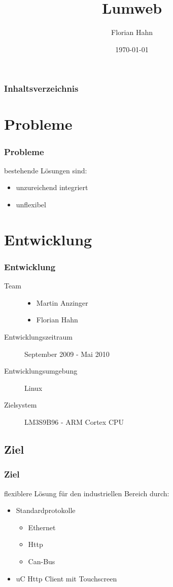 \documentclass{beamer}
\begin{document}
\title{Lumweb}  
\author{Florian Hahn}
\date{\today} 

\begin{frame}
\titlepage
\end{frame}

\begin{frame}\frametitle{Inhaltsverzeichnis}\tableofcontents
\end{frame} 


\section{Probleme} 
\begin{frame}\frametitle{Probleme}
  bestehende Lösungen sind:\\
  \begin{itemize}
    \item unzureichend integriert
    \item unflexibel
  \end{itemize}
\end{frame}



\section{Entwicklung} 
\begin{frame}\frametitle{Entwicklung}
  \begin{description}
    \item [Team]
      \begin{itemize}
        \item Martin Anzinger
        \item Florian Hahn
      \end{itemize}
    \item[Entwicklungszeitraum] September 2009 - Mai 2010
    \item[Entwicklungsumgebung] Linux
    \item[Zielsystem] LM3S9B96 - ARM Cortex CPU 
  \end{description}
\end{frame}

\subsection{Ziel}
\begin{frame}\frametitle{Ziel}
  flexiblere Lösung für den industriellen Bereich durch:
  \begin{itemize}
    \item Standardprotokolle
       \begin{itemize}
         \item Ethernet
         \item Http
         \item Can-Bus
       \end{itemize}
    \item uC Http Client mit Touchscreen
  \end{itemize}
\end{frame}
\end{document}
